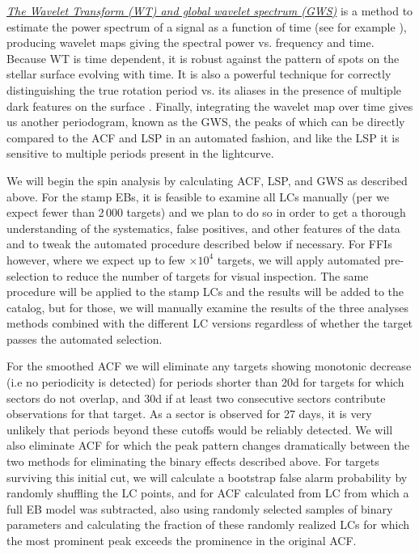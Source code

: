\textit{\underline{The Wavelet Transform (WT) and global wavelet spectrum
(GWS)}} is a method to estimate the power spectrum of a signal as a function of
time (see for example \citep{Grossmann_Morlet_84}), producing wavelet maps
giving the spectral power vs. frequency and time. Because WT is time dependent,
it is robust against the pattern of spots on the stellar surface evolving with
time.  It is also a powerful technique for correctly distinguishing the true
rotation period vs. its aliases in the presence of multiple dark features on the
surface \citep{Bravo_et_al_14}. Finally, integrating the wavelet map over time
gives us another periodogram, known as the GWS, the peaks of which can be
directly compared to the ACF and LSP in an automated fashion, and like the LSP
it is sensitive to multiple periods present in the lightcurve.

We will begin the spin analysis by calculating ACF, LSP, and GWS as described
above. For the stamp EBs, it is feasible to examine all LCs manually (per
 we expect fewer than 2\,000 targets) and we plan to do so
in order to get a thorough understanding of the systematics, false positives,
and other features of the data and to tweak the automated procedure described
below if necessary. For FFIs however, where we expect up to few $\times10^4$
targets, we will apply automated pre-selection to reduce the number of targets
for visual inspection. The same procedure will be applied to the stamp LCs and
the results will be added to the catalog, but for those, we will manually
examine the results of the three analyses methods combined with the different LC
versions regardless of whether the target passes the automated selection.

For the smoothed ACF we will eliminate any targets showing monotonic decrease
(i.e no periodicity is detected) for periods shorter than 20d  for targets for
which \tess{} sectors do not overlap, and 30d if at least two consecutive
sectors contribute observations for that target. As a sector is observed for 27
days, it is very unlikely that periods beyond these cutoffs would be reliably
detected. We will also eliminate ACF for which the peak pattern changes
dramatically between the two methods for eliminating the binary effects
described above. For targets surviving this initial cut, we will calculate a
bootstrap false alarm probability by randomly shuffling the LC points, and for
ACF calculated from LC from which a full EB model was subtracted, also using
randomly selected samples of binary parameters and calculating the fraction of
these randomly realized LCs for which the most prominent peak exceeds the
prominence in the original ACF.

